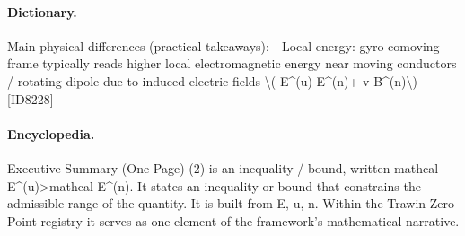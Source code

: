 \paragraph{Dictionary.}
Main physical differences (practical takeaways): - Local energy: gyro comoving frame typically reads higher local electromagnetic energy near moving conductors / rotating dipole due to induced electric fields \textbackslash{}( E\textasciicircum{}(u) E\textasciicircum{}(n)+ v B\textasciicircum{}(n)\textbackslash{}) [ID8228]

\paragraph{Encyclopedia.}
Executive Summary (One Page) (2) is an inequality / bound, written mathcal E\textasciicircum{}(u)>mathcal E\textasciicircum{}(n). It states an inequality or bound that constrains the admissible range of the quantity. It is built from E, u, n. Within the Trawin Zero Point registry it serves as one element of the framework's mathematical narrative.
